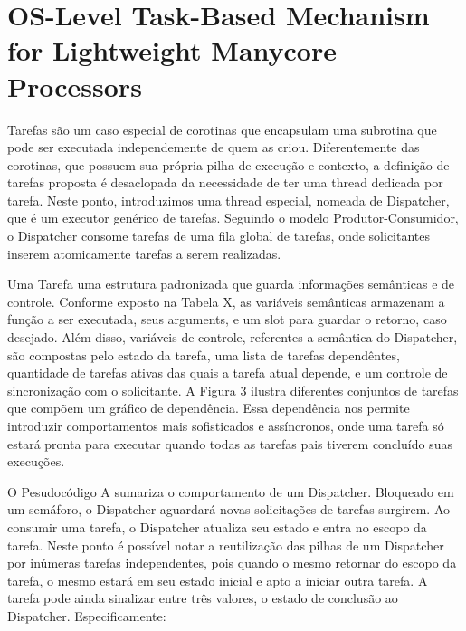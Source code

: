\section{OS-Level Task-Based Mechanism for Lightweight Manycore Processors}
\label{sec:solution}

	Tarefas são um caso especial de corotinas que encapsulam uma subrotina que
	pode ser executada independemente de quem as criou.  Diferentemente das
	corotinas, que possuem sua própria pilha de execução e contexto, a definição de
	tarefas proposta é desaclopada da necessidade de ter uma thread dedicada por
	tarefa. Neste ponto, introduzimos uma thread especial, nomeada de Dispatcher,
	que é um executor genérico de tarefas.  Seguindo o modelo Produtor-Consumidor,
	o Dispatcher consome tarefas de uma fila global de tarefas, onde solicitantes
	inserem atomicamente tarefas a serem realizadas.

	Uma Tarefa uma estrutura padronizada que guarda informações
	semânticas e de controle. Conforme exposto na Tabela X, as variáveis
	semânticas armazenam a função a ser executada, seus arguments, e um slot para
	guardar o retorno, caso desejado. Além disso, variáveis de controle,
	referentes a semântica do Dispatcher, são compostas pelo estado da tarefa,
	uma lista de tarefas dependêntes, quantidade de tarefas ativas das quais
	a tarefa atual depende, e um controle de sincronização com o solicitante.
	A Figura 3 ilustra diferentes conjuntos de tarefas que compõem um gráfico
	de dependência. Essa dependência nos permite introduzir comportamentos mais
	sofisticados e assíncronos, onde uma tarefa só estará pronta para executar
	quando todas as tarefas pais tiverem concluído suas execuções.

	O Pesudocódigo A sumariza o comportamento de um Dispatcher. Bloqueado em um
	semáforo, o Dispatcher aguardará novas solicitações de tarefas surgirem.
	Ao consumir uma tarefa, o Dispatcher atualiza seu estado e entra no escopo
	da tarefa. Neste ponto é possível notar a reutilização das pilhas de um
	Dispatcher por inúmeras tarefas independentes, pois quando o mesmo retornar
	do escopo da tarefa, o mesmo estará em seu estado inicial e apto a iniciar
	outra tarefa.
	A tarefa pode ainda sinalizar entre três valores, o estado de conclusão ao
	Dispatcher. Especificamente:

